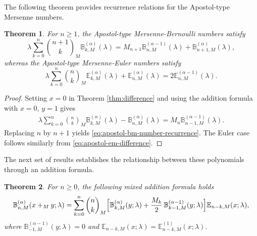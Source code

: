\documentclass[12pt, a4paper]{article}
\newtheorem{theorem}{Theorem}[section]
\theoremstyle{definition}
\numberwithin{equation}{section}
\newcommand{\B}{\mathbb{B}}
\newcommand{\E}{\mathbb{E}}
\begin{document}
The following theorem provides recurrence relations for the Apostol-type Mersenne numbers.

\begin{theorem}\label{thm:number-recurrence}
For $n\ge 1$, the Apostol-type Mersenne-Bernoulli numbers satisfy
\begin{equation}\label{eq:apostol-bm-number-recurrence}
\lambda \sum_{k=0}^n \binom{n+1}{k}_M \B_{k,M}^{(\alpha)}(\lambda) = M_{n+1} \B_{n,M}^{(\alpha-1)}(\lambda) + \B_{n+1,M}^{(\alpha)}(\lambda),
\end{equation}
whereas the Apostol-type Mersenne-Euler numbers satisfy
\begin{equation}\label{eq:apostol-em-number-recurrence}
\lambda \sum_{k=0}^n \binom{n}{k}_M \E_{k,M}^{(\alpha)}(\lambda) + \E_{n,M}^{(\alpha)}(\lambda) = 2 \E_{n,M}^{(\alpha-1)}(\lambda).
\end{equation}
\end{theorem}

\begin{proof}
Setting $x=0$ in Theorem \ref{thm:difference} and using the addition formula with $x=0$, $y=1$ gives
\begin{align*}
\lambda \sum_{k=0}^n \binom{n}{k}_M \B_{k,M}^{(\alpha)}(\lambda) - \B_{n,M}^{(\alpha)}(\lambda) = M_n \B_{n-1,M}^{(\alpha-1)}(\lambda).
\end{align*}
Replacing $n$ by $n+1$ yields \eqref{eq:apostol-bm-number-recurrence}. The Euler case follows similarly from \eqref{eq:apostol-em-difference}.
\end{proof}

The next set of results establishes the relationship between these polynomials through an addition formula.
\begin{theorem}\label{thm:mixed-bernoulli}
For $n\geq 0$, the following mixed addition formula holds
\[
\B_{n,M}^{(\alpha)}(x+_M y;\lambda)
= \sum_{k=0}^n \binom{n}{k}_M
\Bigl[\B_{k,M}^{(\alpha)}(y;\lambda) + \frac{M_k}{2}\,\B_{k-1,M}^{(\alpha-1)}(y;\lambda)\Bigr]
\E_{n-k,M}(x;\lambda),
\]
where $\B_{-1,M}^{(\alpha-1)}(y;\lambda)=0$ and $\E_{n-k,M}(x;\lambda)=\E_{n-k,M}^{(1)}(x;\lambda)$.
\end{theorem}
\end{document}
